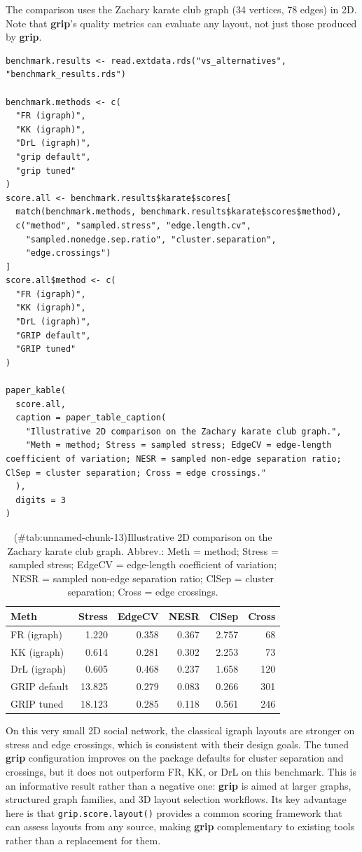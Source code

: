 The comparison uses the Zachary karate club graph (34 vertices, 78 edges)
in 2D. Note that \textbf{grip}'s quality metrics can evaluate any layout, not
just those produced by \textbf{grip}.

\begin{verbatim}
benchmark.results <- read.extdata.rds("vs_alternatives", "benchmark_results.rds")

benchmark.methods <- c(
  "FR (igraph)",
  "KK (igraph)",
  "DrL (igraph)",
  "grip default",
  "grip tuned"
)
score.all <- benchmark.results$karate$scores[
  match(benchmark.methods, benchmark.results$karate$scores$method),
  c("method", "sampled.stress", "edge.length.cv",
    "sampled.nonedge.sep.ratio", "cluster.separation",
    "edge.crossings")
]
score.all$method <- c(
  "FR (igraph)",
  "KK (igraph)",
  "DrL (igraph)",
  "GRIP default",
  "GRIP tuned"
)

paper_kable(
  score.all,
  caption = paper_table_caption(
    "Illustrative 2D comparison on the Zachary karate club graph.",
    "Meth = method; Stress = sampled stress; EdgeCV = edge-length coefficient of variation; NESR = sampled non-edge separation ratio; ClSep = cluster separation; Cross = edge crossings."
  ),
  digits = 3
)
\end{verbatim}

\begin{table}

\caption{(\#tab:unnamed-chunk-13)Illustrative 2D comparison on the Zachary karate club graph. Abbrev.: Meth = method; Stress = sampled stress; EdgeCV = edge-length coefficient of variation; NESR = sampled non-edge separation ratio; ClSep = cluster separation; Cross = edge crossings.}
\centering
\begin{tabular}[t]{l|r|r|r|r|r}
\hline
Meth & Stress & EdgeCV & NESR & ClSep & Cross\\
\hline
FR (igraph) & 1.220 & 0.358 & 0.367 & 2.757 & 68\\
\hline
KK (igraph) & 0.614 & 0.281 & 0.302 & 2.253 & 73\\
\hline
DrL (igraph) & 0.605 & 0.468 & 0.237 & 1.658 & 120\\
\hline
GRIP default & 13.825 & 0.279 & 0.083 & 0.266 & 301\\
\hline
GRIP tuned & 18.123 & 0.285 & 0.118 & 0.561 & 246\\
\hline
\end{tabular}
\end{table}

On this very small 2D social network, the classical igraph layouts are
stronger on stress and edge crossings, which is consistent with their design
goals. The tuned \textbf{grip} configuration improves on the package defaults for
cluster separation and crossings, but it does not outperform FR, KK, or DrL
on this benchmark. This is an informative result rather than a negative one:
\textbf{grip} is aimed at larger graphs, structured graph families, and 3D layout
selection workflows. Its key advantage here is that \texttt{grip.score.layout()}
provides a common scoring framework that can assess layouts from any source,
making \textbf{grip} complementary to existing tools rather than a replacement for
them.

